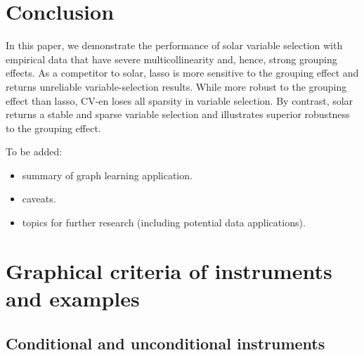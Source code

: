 \documentclass[11pt,review,authoryear]{elsarticle}
\begin{document}
\section{Conclusion}

In this paper, we demonstrate the performance of solar variable selection with empirical data that have severe multicollinearity and, hence, strong grouping effects. As a competitor to solar, lasso is more sensitive to the grouping effect and returns unreliable variable-selection results. While more robust to the grouping effect than lasso, CV-en loses all sparsity in variable selection. By contrast, solar returns a stable and sparse variable selection and illustrates superior robustness to the grouping effect.

To be added:
\begin{itemize}
  \item summary of graph learning application.
  \item caveats.
  \item topics for further research (including potential data applications).
\end{itemize}


\newpage





\newpage
\appendix
\setcounter{section}{0}

\section{Graphical criteria of instruments and examples \label{App:IV_def}}


\subsection*{Conditional and unconditional instruments}
\end{document}
